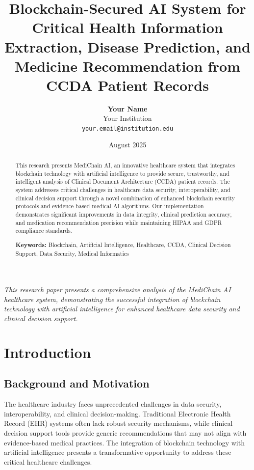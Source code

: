 \documentclass[12pt,a4paper]{article}
\title{\Huge\textbf{Blockchain-Secured AI System for Critical Health Information Extraction, Disease Prediction, and Medicine Recommendation from CCDA Patient Records}}
\author{\Large\textbf{Your Name}\\[0.5cm] \large Your Institution\\[0.3cm] \large \texttt{your.email@institution.edu}}
\date{\large August 2025}
\begin{document}
\maketitle
\thispagestyle{empty}
\vfill
\begin{center}
\textit{This research paper presents a comprehensive analysis of the MediChain AI healthcare system, demonstrating the successful integration of blockchain technology with artificial intelligence for enhanced healthcare data security and clinical decision support.}
\end{center}
\vfill
\newpage

\begin{abstract}
\noindent This research presents MediChain AI, an innovative healthcare system that integrates blockchain technology with artificial intelligence to provide secure, trustworthy, and intelligent analysis of Clinical Document Architecture (CCDA) patient records. The system addresses critical challenges in healthcare data security, interoperability, and clinical decision support through a novel combination of enhanced blockchain security protocols and evidence-based medical AI algorithms. Our implementation demonstrates significant improvements in data integrity, clinical prediction accuracy, and medication recommendation precision while maintaining HIPAA and GDPR compliance standards.

\vspace{0.5cm}
\noindent\textbf{Keywords:} Blockchain, Artificial Intelligence, Healthcare, CCDA, Clinical Decision Support, Data Security, Medical Informatics
\end{abstract}

\newpage

\tableofcontents
\newpage

\section{Introduction}

\subsection{Background and Motivation}

The healthcare industry faces unprecedented challenges in data security, interoperability, and clinical decision-making. Traditional Electronic Health Record (EHR) systems often lack robust security mechanisms, while clinical decision support tools provide generic recommendations that may not align with evidence-based medical practices. The integration of blockchain technology with artificial intelligence presents a transformative opportunity to address these critical healthcare challenges.
\end{document}
